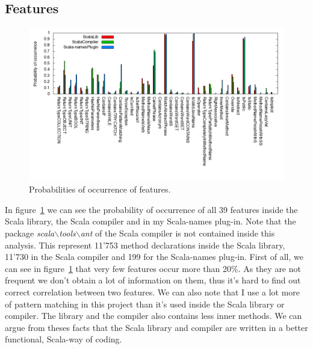 \documentclass[12pt]{article}
\begin{document}
\subsection {Features}
\begin{figure}
\centering
\includegraphics[width=15cm]{images/percent.png}
\caption{Probabilities of occurrence of features.}
\label{fig:features}
\end{figure}
In figure~\ref{fig:features} we can see the probability of occurrence of all 39 features inside the Scala library, the Scala compiler and in my Scala-names plug-in. Note that the package \textit{scala$\backslash$tools$\backslash$ant} of the Scala compiler is not contained inside this analysis. This represent 11'753 method declarations inside the Scala library, 11'730 in the Scala compiler and 199 for the Scala-names plug-in. First of all, we can see in figure~\ref{fig:features} that very few features occur more than 20\%. As they are not frequent we don't obtain a lot of information on them, thus it's hard to find out correct correlation between two features. We can also note that I use a lot more of pattern matching in this project than it's used inside the Scala library or compiler. The library and the compiler also contains less inner methods. We can argue from theses facts that the Scala library and compiler are written in a better functional, Scala-way of coding.
\end{document}
